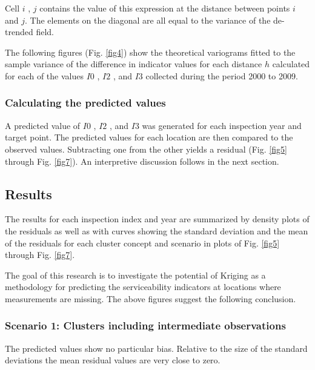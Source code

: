 \documentclass[Journal]{ascelike}
\begin{document}
Cell $i$ , $j$ contains the value of this expression at the distance between points $i$ and $j$. The elements on the diagonal are all equal 
to the variance of the de-trended field.

The following figures (Fig. \ref{fig4}) show the theoretical variograms fitted to the sample variance of the difference in indicator 
values for each distance $h$ calculated for each of the values $I0$ , $I2$ , and $I3$ collected during the period 2000 to 2009. %

\subsubsection{Calculating the predicted values} \label{casestudy33}
A predicted value of $I0$ , $I2$ , and $I3$ was generated for each inspection year and target point. The predicted 
values for each location are then compared to the observed values. Subtracting one from the other yields a residual (Fig. \ref{fig5} through Fig. \ref{fig7}). 
An interpretive discussion follows in the next section.
\subsection{Results} \label{casestudy4}
The results for each inspection index and year are summarized by density plots of the residuals as well as with curves showing the standard deviation and the mean of the residuals for each cluster concept and scenario in plots of Fig. \ref{fig5} through Fig. \ref{fig7}.

The goal of this research is to investigate the potential of Kriging as a methodology for predicting the serviceability indicators at locations where measurements are missing. The above figures suggest the following conclusion.
%
\subsubsection{Scenario 1: Clusters including intermediate observations} \label{casestudy41}
The predicted values show no particular bias. Relative to the size of the standard
deviations the mean residual values are very close to zero.
\end{document}
